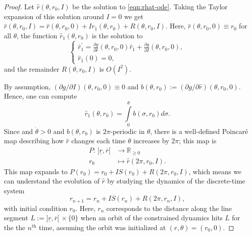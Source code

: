 \documentclass[journal,twoside,web]{ieeecolor}
\begin{document}
{\begin{proof}
    Let \(\hat{r}(\theta,r_0,I)\) be the solution to \eqref{eqn:rhat-ode}.
    Taking the Taylor expansion of this solution around \(I = 0\) we get
    \(\hat{r}(\theta,r_0,I) = \hat{r}(\theta,r_0,0) + I\hat{r}_1(\theta,r_0) 
    + R(\theta,r_0,I)\). 
    Here, \(\hat{r}(\theta,r_0,0) \equiv r_0\) for all \(\theta\),
    the function \(\hat{r}_1(\theta,r_0)\) is the solution to
    \begin{equation}
        \begin{cases}
        \hat{r}_1^\prime = 
        \frac{\partial g}{\partial \hat{r}}(\theta,r_0,0)\hat{r}_1 +
        \frac{\partial g}{\partial I}(\theta,r_0,0)
        , \\
        \hat{r}_1(0) = 0
        ,
    \end{cases}
    \end{equation}
    and the remainder \(R(\theta,r_0,I)\) is \(O(I^2)\).

    By assumption, \((\partial g/\partial I)(\theta,r_0,0) \equiv 0\) and
    \(b(\theta,r_0) := (\partial g/\partial \hat{r})(\theta,r_0,0)\). 
    Hence, one can compute
    \[
        \hat{r}_1(\theta,r_0) = \int\limits_0^\theta b(\sigma,r_0)d\sigma
        .
    \]
    Since and \(\dot{\theta} > 0\) and \(b(\theta,r_0)\) is \(2\pi\)-periodic in
    \(\theta\), there is a well-defined Poincar\'{e} map describing
    how \(\hat{r}\) changes each time \(\theta\) increases by \(2\pi\);
    this map is 
    \begin{align*}
        P : \, ]\underline{r},\overline{r}[ &\to \mathbb{R}_{\geq 0} \\
        r_0 &\mapsto \hat{r}(2\pi,r_0,I)
        .
    \end{align*}
    This map expands to \(P(r_0) = r_0 + IS(r_0) + R(2\pi,r_0,I)\), which
    means we can understand the evolution of \(\hat{r}\) by studying
    the dynamics of the discrete-time system
    \begin{equation}\label{eqn:r-discrete}
        r_{n+1} = r_n + IS(r_n) + R(2\pi,r_n,I)
        ,
    \end{equation}
    with initial condition \(r_0\).
    Here, \(r_n\) corresponds to the distance along the line segment
    \(L := ]\underline{r},\overline{r}[ \, \times \{0\}\)
    when an orbit of the constrained dynamics hits \(L\) for the
    the \(n^\text{th}\) time, assuming the orbit was initialized at
    \((r,\theta) = (r_0,0)\).


\end{proof}}
\end{document}
